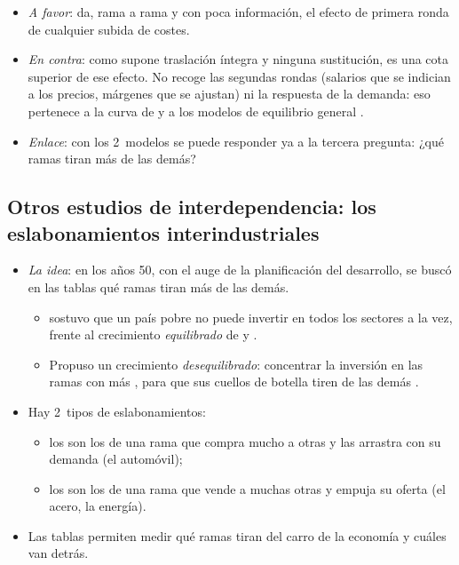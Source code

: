 \documentclass[11pt]{article}
\begin{document}
\begin{itemize}
\item \emph{A favor}: da, rama a rama y con poca información, el efecto de primera ronda de cualquier subida de costes.
\item \emph{En contra}: como supone traslación íntegra y ninguna sustitución, es una cota superior de ese efecto. No recoge las segundas rondas (salarios que se indician a los precios, márgenes que se ajustan) ni la respuesta de la demanda: eso pertenece a la curva de  y a los modelos de equilibrio general .
\item \emph{Enlace}: con los 2~modelos se puede responder ya a la tercera pregunta: ¿qué ramas tiran más de las demás?
\end{itemize}

\subsection{Otros estudios de interdependencia:\cortetitulo{} los eslabonamientos interindustriales}\label{sec:eslabonamientos}

\begin{itemize}
\item \emph{La idea}: en los años 50, con el auge de la planificación del desarrollo, se buscó en las tablas qué ramas tiran más de las demás.
  \begin{itemize}
  \item \textcite{Hirschman1958} sostuvo que un país pobre no puede invertir en todos los sectores a la vez, frente al crecimiento \emph{equilibrado} de  y .
  \item Propuso un crecimiento \emph{desequilibrado}: concentrar la inversión en las ramas con más , para que sus cuellos de botella tiren de las demás .
  \end{itemize}
\item Hay 2~tipos de eslabonamientos:
  \begin{itemize}
  \item los  son los de una rama que compra mucho a otras y las arrastra con su demanda (el automóvil);
  \item los  son los de una rama que vende a muchas otras y empuja su oferta (el acero, la energía).
  \end{itemize}
\item Las tablas permiten medir qué ramas tiran del carro de la economía y cuáles van detrás.
\end{itemize}
\end{document}

